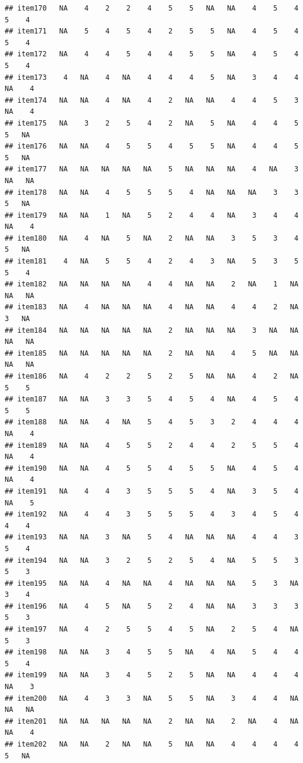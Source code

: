 \documentclass[
  man]{apa6}
\begin{document}
\begin{verbatim}
## item170   NA    4    2    2    4    5    5   NA   NA    4    5    4    5    4
## item171   NA    5    4    5    4    2    5    5   NA    4    5    4    5    4
## item172   NA    4    4    5    4    4    5    5   NA    4    5    4    5    4
## item173    4   NA    4   NA    4    4    4    5   NA    3    4    4   NA    4
## item174   NA   NA    4   NA    4    2   NA   NA    4    4    5    3   NA    4
## item175   NA    3    2    5    4    2   NA    5   NA    4    4    5    5   NA
## item176   NA   NA    4    5    5    4    5    5   NA    4    4    5    5   NA
## item177   NA   NA   NA   NA   NA    5   NA   NA   NA    4   NA    3   NA   NA
## item178   NA   NA    4    5    5    5    4   NA   NA   NA    3    3    5   NA
## item179   NA   NA    1   NA    5    2    4    4   NA    3    4    4   NA    4
## item180   NA    4   NA    5   NA    2   NA   NA    3    5    3    4    5   NA
## item181    4   NA    5    5    4    2    4    3   NA    5    3    5    5    4
## item182   NA   NA   NA   NA    4    4   NA   NA    2   NA    1   NA   NA   NA
## item183   NA    4   NA   NA   NA    4   NA   NA    4    4    2   NA    3   NA
## item184   NA   NA   NA   NA   NA    2   NA   NA   NA    3   NA   NA   NA   NA
## item185   NA   NA   NA   NA   NA    2   NA   NA    4    5   NA   NA   NA   NA
## item186   NA    4    2    2    5    2    5   NA   NA    4    2   NA    5    5
## item187   NA   NA    3    3    5    4    5    4   NA    4    5    4    5    5
## item188   NA   NA    4   NA    5    4    5    3    2    4    4    4   NA    4
## item189   NA   NA    4    5    5    2    4    4    2    5    5    4   NA    4
## item190   NA   NA    4    5    5    4    5    5   NA    4    5    4   NA    4
## item191   NA    4    4    3    5    5    5    4   NA    3    5    4   NA    5
## item192   NA    4    4    3    5    5    5    4    3    4    5    4    4    4
## item193   NA   NA    3   NA    5    4   NA   NA   NA    4    4    3    5    4
## item194   NA   NA    3    2    5    2    5    4   NA    5    5    3    5    3
## item195   NA   NA    4   NA   NA    4   NA   NA   NA    5    3   NA    3    4
## item196   NA    4    5   NA    5    2    4   NA   NA    3    3    3    5    3
## item197   NA    4    2    5    5    4    5   NA    2    5    4   NA    5    3
## item198   NA   NA    3    4    5    5   NA    4   NA    5    4    4    5    4
## item199   NA   NA    3    4    5    2    5   NA   NA    4    4    4   NA    3
## item200   NA    4    3    3   NA    5    5   NA    3    4    4   NA   NA   NA
## item201   NA   NA   NA   NA   NA    2   NA   NA    2   NA    4   NA   NA    4
## item202   NA   NA    2   NA   NA    5   NA   NA    4    4    4    4    5   NA

\end{verbatim}
\end{document}
